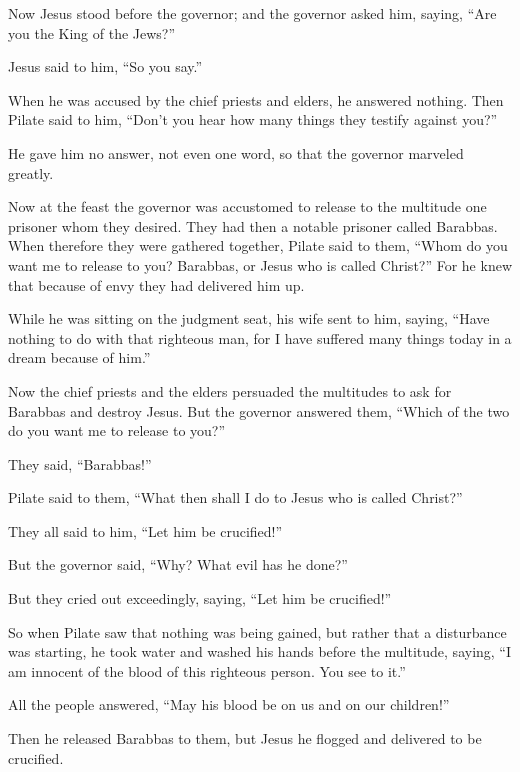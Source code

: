  Now Jesus stood before the governor; and the governor
asked him, saying, ``Are you the King of the Jews?''

Jesus said to him, ``So you say.''

 When he was accused by the chief priests and elders, he
answered nothing.  Then Pilate said to him, ``Don't you
hear how many things they testify against you?''

 He gave him no answer, not even one word, so that the
governor marveled greatly.

 Now at the feast the governor was accustomed to release to
the multitude one prisoner whom they desired.  They had
then a notable prisoner called Barabbas.  When therefore
they were gathered together, Pilate said to them, ``Whom do you want me
to release to you? Barabbas, or Jesus who is called Christ?''
 For he knew that because of envy they had delivered him
up.

 While he was sitting on the judgment seat, his wife sent
to him, saying, ``Have nothing to do with that righteous man, for I have
suffered many things today in a dream because of him.''

 Now the chief priests and the elders persuaded the
multitudes to ask for Barabbas and destroy Jesus.  But the
governor answered them, ``Which of the two do you want me to release to
you?''

They said, ``Barabbas!''

 Pilate said to them, ``What then shall I do to Jesus who
is called Christ?''

They all said to him, ``Let him be crucified!''

 But the governor said, ``Why? What evil has he done?''

But they cried out exceedingly, saying, ``Let him be crucified!''

 So when Pilate saw that nothing was being gained, but
rather that a disturbance was starting, he took water and washed his
hands before the multitude, saying, ``I am innocent of the blood of this
righteous person. You see to it.''

 All the people answered, ``May his blood be on us and on
our children!''

 Then he released Barabbas to them, but Jesus he flogged
and delivered to be crucified.

